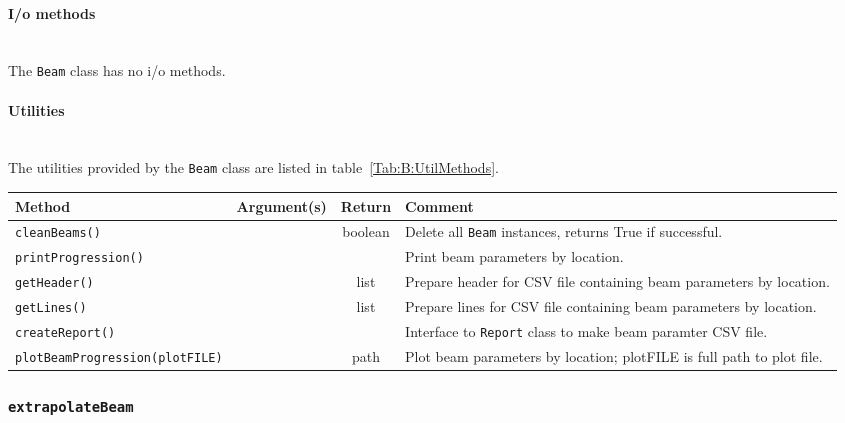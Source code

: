 \paragraph{I/o methods}\mbox{}\\
\noindent
The \texttt{Beam} class has no i/o methods.

\paragraph{Utilities}\mbox{}\\
\noindent
The utilities provided by the \texttt{Beam} class are listed in
table~\ref{Tab:B:UtilMethods}.
\begin{sidewaystable}[h]
  \caption{
    Utilities provided by the \texttt{Beam}
    class. 
  }
  \label{Tab:B:UtilMethods}
  \begin{center}
    \begin{tabular}{|l|c|c|p{10cm}|}
      \hline
      \textbf{Method} & \textbf{Argument(s)} & \textbf{Return} & \textbf{Comment}                                         \\
      \hline
      \texttt{cleanBeams()}                  &  & boolean & Delete all \texttt{Beam} instances, returns True if successful.       \\
      \texttt{printProgression()}            &  &         & Print beam parameters by location.                                    \\
      \texttt{getHeader()}                   &  & list    & Prepare header for CSV file containing beam parameters by location.   \\
      \texttt{getLines()}                    &  & list    & Prepare lines for CSV file containing beam parameters by location.    \\
      \texttt{createReport()}                &  &         & Interface to \texttt{Report} class to make beam paramter CSV file.    \\
      \texttt{plotBeamProgression(plotFILE)} &  & path    & Plot beam parameters by location; plotFILE is full path to plot file. \\
      \hline
    \end{tabular}
  \end{center}
\end{sidewaystable}

\FloatBarrier

\subsubsection{\texttt{extrapolateBeam}}


